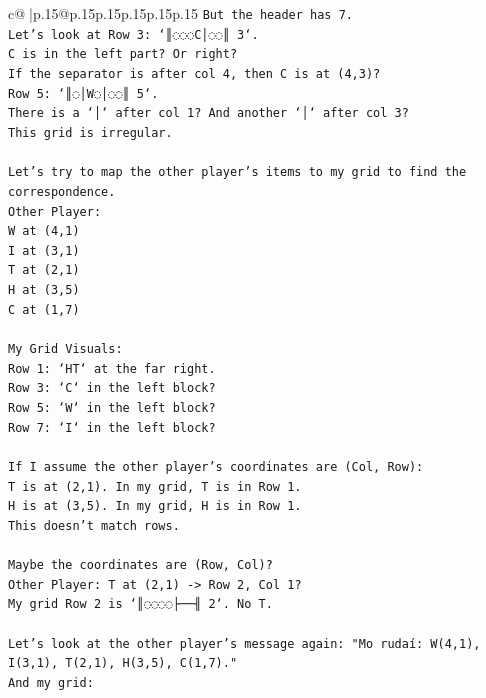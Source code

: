 \documentclass{article}
\begin{document}
{\begin{supertabular}{c@{$\;$}|p{.15\linewidth}@{}p{.15\linewidth}p{.15\linewidth}p{.15\linewidth}p{.15\linewidth}p{.15\linewidth}}
{{{\texttt{But the header has 7.} \\
\texttt{Let's look at Row 3: `║◌◌◌C│◌◌║ 3`.} \\
\texttt{C is in the left part? Or right?} \\
\texttt{If the separator is after col 4, then C is at (4,3)?} \\
\texttt{Row 5: `║◌│W◌│◌◌║ 5`.} \\
\texttt{There is a `│` after col 1? And another `│` after col 3?} \\
\texttt{This grid is irregular.} \\
\\ 
\texttt{Let's try to map the other player's items to my grid to find the correspondence.} \\
\texttt{Other Player:} \\
\texttt{W at (4,1)} \\
\texttt{I at (3,1)} \\
\texttt{T at (2,1)} \\
\texttt{H at (3,5)} \\
\texttt{C at (1,7)} \\
\\ 
\texttt{My Grid Visuals:} \\
\texttt{Row 1: `HT` at the far right.} \\
\texttt{Row 3: `C` in the left block?} \\
\texttt{Row 5: `W` in the left block?} \\
\texttt{Row 7: `I` in the left block?} \\
\\ 
\texttt{If I assume the other player's coordinates are (Col, Row):} \\
\texttt{T is at (2,1). In my grid, T is in Row 1.} \\
\texttt{H is at (3,5). In my grid, H is in Row 1.} \\
\texttt{This doesn't match rows.} \\
\\ 
\texttt{Maybe the coordinates are (Row, Col)?} \\
\texttt{Other Player: T at (2,1) {-}> Row 2, Col 1?} \\
\texttt{My grid Row 2 is `║◌◌◌◌├──╢ 2`. No T.} \\
\\ 
\texttt{Let's look at the other player's message again: "Mo rudaí: W(4,1), I(3,1), T(2,1), H(3,5), C(1,7)."} \\
\texttt{And my grid:} \\
}}}
\end{supertabular}}
\end{document}
